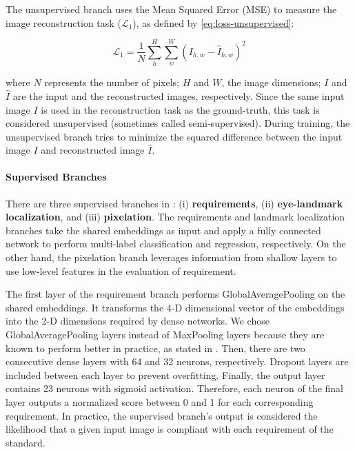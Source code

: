The unsupervised branch uses the Mean Squared Error (MSE) to measure the image reconstruction task ($\mathcal{L}_1$), as defined by \autoref{eq:loss-unsupervised}:
 
\begin{equation}
\label{eq:loss-unsupervised}
\mathcal{L}_1 = \frac{1}{N} \sum_h^H \sum_w^W ({I_{h,w} - \hat{I}_{h,w}})^2
\end{equation}
 
\noindent where $N$ represents the number of pixels; $H$ and $W$, the image dimensions; $I$ and $\hat{I}$ are the input and the reconstructed images, respectively. Since the same input image $I$ is used in the reconstruction task as the ground-truth, this task is considered unsupervised (sometimes called semi-supervised). During training, the unsupervised branch tries to minimize the squared difference between the input image $I$ and reconstructed image $\hat{I}$.
 
\paragraph{Supervised Branches} \label{sec:supervisedbranches}
 
There are three supervised branches in \methodname: (i) \textbf{requirements}, (ii) \textbf{ eye-landmark localization}, and (iii) \textbf{pixelation}. The requirements and landmark localization branches take the shared embeddings as input and apply a fully connected network to perform multi-label classification and regression, respectively. On the other hand, the pixelation branch leverages information from shallow layers to use low-level features in the evaluation of \pixelation requirement. 
 
The first layer of the requirement branch performs GlobalAveragePooling on the shared embeddings. It transforms the 4-D dimensional vector of the embeddings into the 2-D dimensions required by dense networks. We chose GlobalAveragePooling layers instead of MaxPooling layers because they are known to perform better in practice, as stated in \cite{zhou2016learning}. Then, there are two consecutive dense layers with 64 and 32 neurons, respectively. Dropout layers are included between each layer to prevent overfitting. Finally, the output layer contains 23 neurons with sigmoid activation. Therefore, each neuron of the final layer outputs a normalized score between 0 and 1 for each corresponding requirement. In practice, the supervised branch's output is considered the likelihood that a given input image is compliant with each requirement of the \icao standard.
 
